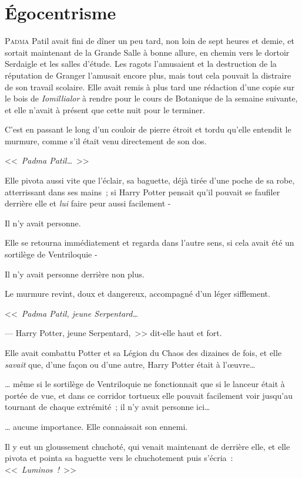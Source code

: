\chapter{Égocentrisme}

\lettrine{P}{adma} Patil avait fini de dîner un peu tard, non loin de sept heures et demie, et sortait maintenant de la Grande Salle à bonne allure, en chemin vers le dortoir Serdaigle et les salles d'étude. Les ragots l'amusaient et la destruction de la réputation de Granger l'amusait encore plus, mais tout cela pouvait la distraire de son travail scolaire. Elle avait remis à plus tard une rédaction d'une copie sur le bois de \emph{Iomillialor} à rendre pour le cours de Botanique de la semaine suivante, et elle n'avait à présent que cette nuit pour le terminer.

C'est en passant le long d'un couloir de pierre étroit et tordu qu'elle entendit le murmure, comme s'il était venu directement de son dos.

<<~\emph{Padma Patil…}~>>

Elle pivota aussi vite que l'éclair, sa baguette, déjà tirée d'une poche de sa robe, atterrissant dans ses mains~; si Harry Potter pensait qu'il pouvait se faufiler derrière elle et \emph{lui} faire peur aussi facilement -

Il n'y avait personne.

Elle se retourna immédiatement et regarda dans l'autre sens, si cela avait été un sortilège de Ventriloquie -

Il n'y avait personne derrière non plus.

Le murmure revint, doux et dangereux, accompagné d'un léger sifflement.

<<~\emph{Padma Patil, jeune Serpentard…}

--- Harry Potter, jeune Serpentard,~>> dit-elle haut et fort.

Elle avait combattu Potter et sa Légion du Chaos des dizaines de fois, et elle \emph{savait} que, d'une façon ou d'une autre, Harry Potter était à l'œuvre…

… même si le sortilège de Ventriloquie ne fonctionnait que si le lanceur était à portée de vue, et dans ce corridor tortueux elle pouvait facilement voir jusqu'au tournant de chaque extrémité~; il n'y avait personne ici…

… aucune importance. Elle connaissait son ennemi.

Il y eut un gloussement chuchoté, qui venait maintenant de derrière elle, et elle pivota et pointa sa baguette vers le chuchotement puis s'écria~: <<~\emph{Luminos~!}~>>

